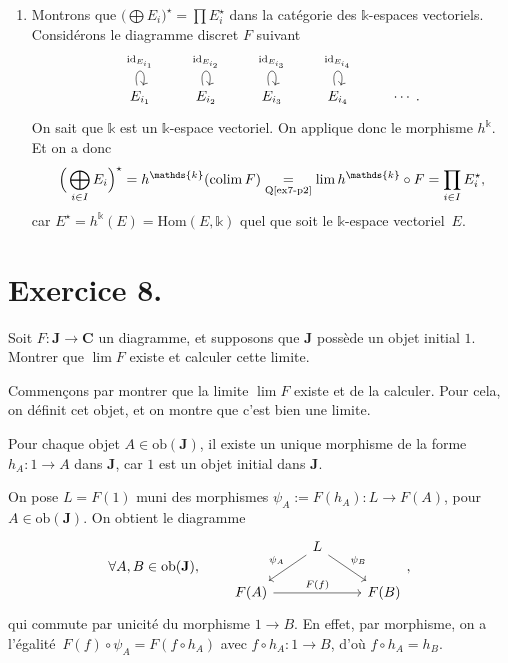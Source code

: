 \documentclass{../../td}
\let\bm\boldsymbol
\begin{document}
\begin{enumerate}
    \item Montrons que $\big(\!\bigoplus E_i\big)^\star = \prod E_i^\star$ dans la catégorie des  $\mathds{k}$-espaces vectoriels.
      Considérons le diagramme discret $F$ suivant \[
        \begin{tikzcd}
          E_{i_1} \arrow[loop above]{}{\mathrm{id}_{E_{i_1}}} &
          E_{i_2} \arrow[loop above]{}{\mathrm{id}_{E_{i_2}}} &
          E_{i_3} \arrow[loop above]{}{\mathrm{id}_{E_{i_3}}} &
          E_{i_4} \arrow[loop above]{}{\mathrm{id}_{E_{i_4}}} & \cdots 
        \end{tikzcd}
      .\]
      On sait que $\mathds{k}$ est un $\mathds{k}$-espace vectoriel. On applique donc le morphisme $h^\mathds{k}$.
      Et on a donc \[
        \Big(\bigoplus_{i \in I} E_i\Big)^\star = h^\mathds{k}(\operatorname{colim} F) \underset {\text{Q\ref{ex7-p2}}} = \lim h^\mathds{k} \circ F = \prod_{i \in I} E_i^\star
      ,\] car $E^\star = h^\mathds{k}(E) = \mathrm{Hom}(E, \mathds{k})$ quel que soit le $\mathds{k}$-espace vectoriel~$E$.
  \end{enumerate}


  \chapter{Exercice 8.}

  \begin{slshape}
    \color{deepblue}
    Soit $F : \mathbf{J} \to \mathbf{C}$ un diagramme, et supposons que $\mathbf{J}$ possède un objet initial $\bm{\mathit{1}}$. Montrer que $\lim F$ existe et calculer cette limite.
  \end{slshape}

  Commençons par montrer que la limite $\lim F$ existe et de la calculer.
  Pour cela, on définit cet objet, et on montre que c'est bien une limite.

  Pour chaque objet $A \in \mathrm{ob}(\mathbf{J})$, il existe un unique morphisme de la forme $h_A : \bm{\mathit{1}} \to A$ dans $\mathbf{J}$, car $\bm{\mathit{1}}$ est un objet initial dans $\mathbf{J}$.

  On pose $L = F(\bm{\mathit{1}})$ muni des morphismes $\psi_A := F(h_A) : L \to F(A)$, pour $A \in \mathrm{ob}(\mathbf{J})$. On obtient le diagramme
  \[
    \forall A,B \in \mathrm{ob}(\mathbf{J}), \quad\quad
  \begin{tikzcd}
    & L \arrow[swap]{dl}{\psi_A} \arrow{dr}{\psi_B}\\
    F(A) \arrow{rr}{F(f)} && F(B)
  \end{tikzcd},
  \]
  qui commute par unicité du morphisme $\bm{\mathit{1}} \to B$. En effet, par morphisme, on a l'égalité~$F(f) \circ \psi_A = F(f \circ h_A)$ avec $f\circ h_A : \bm{\mathit{1}} \to B$, d'où $f\circ h_A = h_B$.
\end{document}
